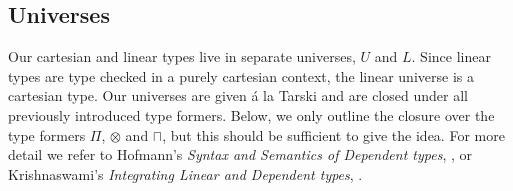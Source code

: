 \subsection{Universes}
Our cartesian and linear types live in separate universes, $U$ and $L$. Since linear types are type checked in a purely cartesian context, the linear universe is a cartesian type. Our universes are given á la Tarski and are closed under all previously introduced type formers. Below, we only outline the closure over the type formers $\Pi$, $\otimes$ and $\sqcap$, but this should be sufficient to give the idea. For more detail we refer to Hofmann's \textit{Syntax and Semantics of Dependent types}, \cite{hofmann1997syntax}, or Krishnaswami's \textit{Integrating Linear and Dependent types}, \cite{krishnaswami}.\\
\\
